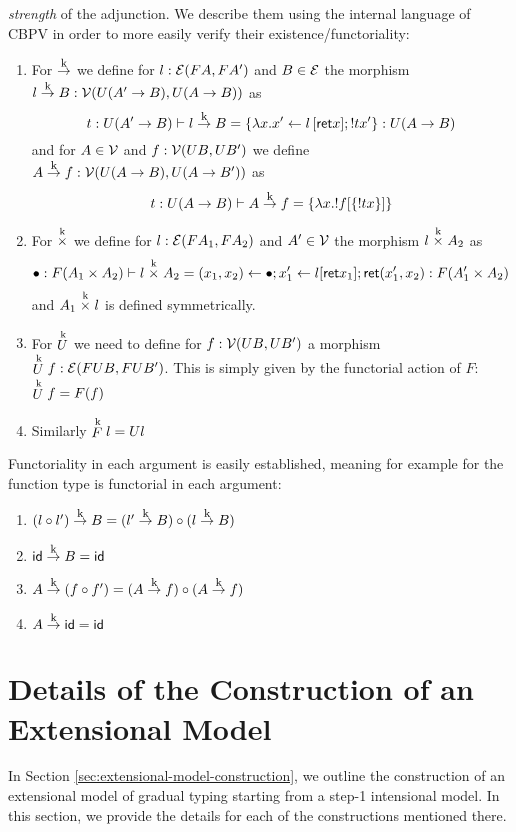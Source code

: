 \emph{strength} of the adjunction. We describe them using the internal
language of CBPV in order to more easily verify their
existence/functoriality:
\begin{enumerate}
\item For $\tok$ we define for $l : \calE(F A,F A')$ and $B \in \calE$ the morphism $l \tok B : \calV(U(A' \to B),U(A\to B))$ as
  \[ t:U(A'\to B) \vdash l \tok B = \{ \lambda x. x' \leftarrow l\,[\ret x]; ! t x'\} : U(A \to B) \]
  and for $A \in \calV$ and $f : \calV(UB,UB')$ we define $A \tok f : \calV(U(A \to B),U(A\to B'))$ as
  \[ t : U(A \to B) \vdash A \tok f = \{ \lambda x. !f[\{ ! t x \}]\} \]
\item For $\timesk$ we define for $l : \calE(F A_1,FA_2)$ and $A' \in \calV$ the morphism $l \timesk A_2$ as
  \[ \bullet : F(A_1\times A_2) \vdash l \timesk A_2 = (x_1,x_2) \leftarrow \bullet; x_1' \leftarrow l[\ret x_1]; \ret (x_1',x_2) : F(A_1'\times A_2)\]
  and $A_1 \timesk l$ is defined symmetrically.
\item For $\Uk$ we need to define for $f : \calV(UB,UB')$ a morphism $\Uk f : \calE(FUB,FUB')$. This is simply given by the functorial action of $F$: $\Uk f = F(f)$
\item Similarly $\Fk l = Ul$
\end{enumerate}

Functoriality in each argument is easily established, meaning for
example for the function type is functorial in each argument:
\begin{enumerate}
\item $(l \circ l') \tok B = (l' \tok B) \circ (l \tok B)$
\item $\id \tok B = \id$
\item $A \tok (f \circ f') = (A \tok f) \circ (A \tok f)$
\item $A \tok \id = \id$
\end{enumerate}

\section{Details of the Construction of an Extensional Model}

In Section \ref{sec:extensional-model-construction}, we outline the construction
of an extensional model of gradual typing starting from a step-1 intensional model.
In this section, we provide the details for each of the constructions mentioned there.

